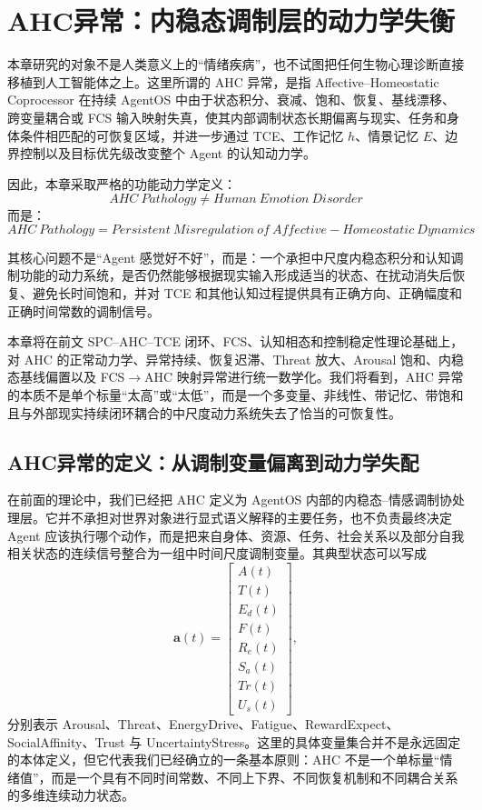 \chapter{AHC异常：内稳态调制层的动力学失衡}
\label{chap:ahc_pathology}

\begin{chapterlead}
本章研究的对象不是人类意义上的“情绪疾病”，也不试图把任何生物心理诊断直接移植到人工智能体之上。这里所谓的 AHC 异常，是指 Affective--Homeostatic Coprocessor 在持续 AgentOS 中由于状态积分、衰减、饱和、恢复、基线漂移、跨变量耦合或 FCS 输入映射失真，使其内部调制状态长期偏离与现实、任务和身体条件相匹配的可恢复区域，并进一步通过 TCE、工作记忆 $h$、情景记忆 $E$、边界控制以及目标优先级改变整个 Agent 的认知动力学。

因此，本章采取严格的功能动力学定义：
\[
\boxed{
AHC\ Pathology
\neq
Human\ Emotion\ Disorder
}
\]
而是：
\[
\boxed{
AHC\ Pathology
=
Persistent\ Misregulation
\ of\
Affective\!-\!Homeostatic\ Dynamics
}
\]

其核心问题不是“Agent 感觉好不好”，而是：一个承担中尺度内稳态积分和认知调制功能的动力系统，是否仍然能够根据现实输入形成适当的状态、在扰动消失后恢复、避免长时间饱和，并对 TCE 和其他认知过程提供具有正确方向、正确幅度和正确时间常数的调制信号。

本章将在前文 SPC--AHC--TCE 闭环、FCS、认知相态和控制稳定性理论基础上，对 AHC 的正常动力学、异常持续、恢复迟滞、Threat 放大、Arousal 饱和、内稳态基线偏置以及 FCS$\rightarrow$AHC 映射异常进行统一数学化。我们将看到，AHC 异常的本质不是单个标量“太高”或“太低”，而是一个多变量、非线性、带记忆、带饱和且与外部现实持续闭环耦合的中尺度动力系统失去了恰当的可恢复性。
\end{chapterlead}


\section{AHC异常的定义：从调制变量偏离到动力学失配}
\label{sec:ahc_pathology_definition}

在前面的理论中，我们已经把 AHC 定义为 AgentOS 内部的内稳态--情感调制协处理层。它并不承担对世界对象进行显式语义解释的主要任务，也不负责最终决定 Agent 应该执行哪个动作，而是把来自身体、资源、任务、社会关系以及部分自我相关状态的连续信号整合为一组中时间尺度调制变量。其典型状态可以写成
\[
\mathbf a(t)
=
\begin{bmatrix}
A(t)\\
T(t)\\
E_d(t)\\
F(t)\\
R_e(t)\\
S_a(t)\\
Tr(t)\\
U_s(t)
\end{bmatrix},
\]
分别表示 Arousal、Threat、EnergyDrive、Fatigue、RewardExpect、SocialAffinity、Trust 与 UncertaintyStress。这里的具体变量集合并不是永远固定的本体定义，但它代表我们已经确立的一条基本原则：AHC 不是一个单标量“情绪值”，而是一个具有不同时间常数、不同上下界、不同恢复机制和不同耦合关系的多维连续动力状态。

